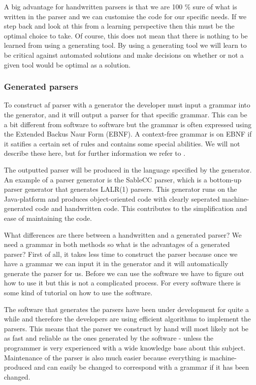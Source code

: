 A big advantage for handwritten parsers is that we are 100 \% sure of what is
written in the parser and we can customise the code for our specific needs. If
we step back and look at this from a learning perspective then this must be the
optimal choice to take. Of course, this does not mean that there is nothing to
be learned from using a generating tool. By using a generating tool we will
learn to be critical against automated solutions and make decisions on whether
or not a given tool would be optimal as a solution.

\subsubsection{Generated parsers}
\label{subsec:generatedparsers}
To construct af parser with a generator the developer must input a grammar into
the generator, and it will output a parser for that specific grammar. This can
be a bit different from software to software but the grammar is often expressed
using the Extended Backus Naur Form (EBNF). A context-free grammar is on EBNF if
it satifies a certain set of rules and contains some special abilities. We will
not describe these here, but for further information we refer to
\cite{fischer2009}.

The outputted parser will be produced in the language specified by the
generator. An example of a parser generator is the SableCC parser, which is a
bottom-up parser generator that generates LALR(1) parsers. This generator runs
on the Java-platform and produces object-oriented code with clearly seperated
machine-generated code and handwritten code. This contributes to the
simplification and ease of maintaining the code.
\cite[p. 11]{sableccdoc}

What differences are there between a handwritten and a generated parser? We need
a grammar in both methods so what is the advantages of a generated parser? First
of all, it takes less time to construct the parser because once we have a
grammar we can input it in the generator and it will automatically generate the
parser for us. Before we can use the software we have to figure out how to use
it but this is not a complicated process. For every software there is some kind
of tutorial on how to use the software.

The software that generates the parsers have been under development for quite a
while and therefore the developers are using efficient algorithms to implement
the parsers. This means that the parser we construct by hand will most likely
not be as fast and reliable as the ones generated by the software - unless the
programmer is very experienced with a wide knowledge base about this subject.
Maintenance of the parser is also much easier because everything is
machine-produced and can easily be changed to correspond with a grammar if it
has been changed.

